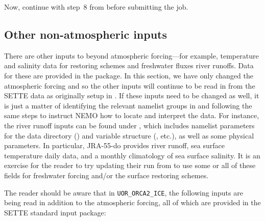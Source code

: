 Now, continue with step~8 from  before submitting the job.


\subsection{Other non-atmospheric inputs}
\label{sec:inputs-other}

There are other inputs to \NEMOSIcu{} beyond atmospheric forcing---for example, temperature and salinity data for restoring schemes and freshwater fluxes river runoffs.
Data for these are provided in the  package.
In this section, we have only changed the atmospheric forcing and so the other inputs will continue to be read in from the SETTE data as originally setup in .
If these inputs need to be changed as well, it is just a matter of identifying the relevant namelist groups in  and following the same steps to instruct NEMO how to locate and interpret the data.
For instance, the river runoff inputs can be found under , which includes namelist parameters for the data directory () and variable structure (, etc.), as well as some physical parameters.
In particular, \mbox{JRA-55-do} provides river runoff, sea surface temperature daily data, and a monthly climatology of sea surface salinity.
It is an exercise for the reader to try updating their run from  to use some or all of these fields for freshwater forcing and/or the surface restoring schemes.

The reader should be aware that in \mbox{\texttt{UOR_ORCA2_ICE}}, the following inputs are being read in addition to the atmospheric forcing, all of which are provided in the SETTE standard input package:

